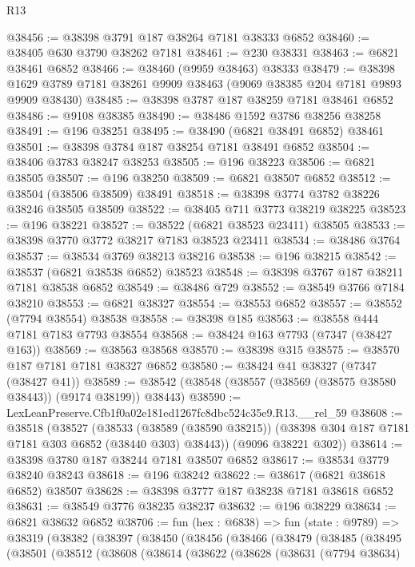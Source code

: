 \begin{lexlean}{R13}
\begin{coremodule}
@38456 := @38398 @3791 @187 @38264 @7181 @38333 @6852
@38460 := @38405 @630 @3790 @38262 @7181
@38461 := @230 @38331
@38463 := @6821 @38461 @6852
@38466 := @38460 (@9959 @38463) @38333
@38479 := @38398 @1629 @3789 @7181 @38261 @9909 @38463 (@9069 @38385 @204 @7181 @9893 @9909 @38430)
@38485 := @38398 @3787 @187 @38259 @7181 @38461 @6852
@38486 := @9108 @38385
@38490 := @38486 @1592 @3786 @38256 @38258
@38491 := @196 @38251
@38495 := @38490 (@6821 @38491 @6852) @38461
@38501 := @38398 @3784 @187 @38254 @7181 @38491 @6852
@38504 := @38406 @3783 @38247 @38253
@38505 := @196 @38223
@38506 := @6821 @38505
@38507 := @196 @38250
@38509 := @6821 @38507 @6852
@38512 := @38504 (@38506 @38509) @38491
@38518 := @38398 @3774 @3782 @38226 @38246 @38505 @38509
@38522 := @38405 @711 @3773 @38219 @38225
@38523 := @196 @38221
@38527 := @38522 (@6821 @38523 @23411) @38505
@38533 := @38398 @3770 @3772 @38217 @7183 @38523 @23411
@38534 := @38486 @3764
@38537 := @38534 @3769 @38213 @38216
@38538 := @196 @38215
@38542 := @38537 (@6821 @38538 @6852) @38523
@38548 := @38398 @3767 @187 @38211 @7181 @38538 @6852
@38549 := @38486 @729
@38552 := @38549 @3766 @7184 @38210
@38553 := @6821 @38327
@38554 := @38553 @6852
@38557 := @38552 (@7794 @38554) @38538
@38558 := @38398 @185
@38563 := @38558 @444 @7181 @7183 @7793 @38554
@38568 := @38424 @163 @7793 (@7347 (@38427 @163))
@38569 := @38563 @38568
@38570 := @38398 @315
@38575 := @38570 @187 @7181 @7181 @38327 @6852
@38580 := @38424 @41 @38327 (@7347 (@38427 @41))
@38589 := @38542 (@38548 (@38557 (@38569 (@38575 @38580 @38443)) (@9174 @38199)) @38443)
@38590 := LexLeanPreserve.Cfb1f0a02e181ed1267fc8dbc524c35e9.R13.__rel_59
@38608 := @38518
    (@38527
      (@38533
        (@38589 (@38590 @38215))
        (@38398 @304 @187 @7181 @7181 @303 @6852 (@38440 @303) @38443))
      (@9096 @38221 @302))
@38614 := @38398 @3780 @187 @38244 @7181 @38507 @6852
@38617 := @38534 @3779 @38240 @38243
@38618 := @196 @38242
@38622 := @38617 (@6821 @38618 @6852) @38507
@38628 := @38398 @3777 @187 @38238 @7181 @38618 @6852
@38631 := @38549 @3776 @38235 @38237
@38632 := @196 @38229
@38634 := @6821 @38632 @6852
@38706 := fun (hex : @6838) =>
  fun (state : @9789) =>
  @38319
    (@38382
      (@38397
        (@38450
          (@38456
            (@38466
              (@38479
                (@38485
                  (@38495
                    (@38501
                      (@38512
                        (@38608
                          (@38614
                            (@38622
                              (@38628
                                (@38631
                                  (@7794 @38634)

\end{coremodule}
\end{lexlean}
